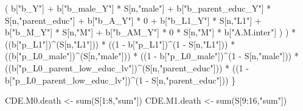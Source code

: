 \documentclass[
]{book}
\newenvironment{Shaded}{\begin{snugshade}}{\end{snugshade}}
\newcommand{\DecValTok}[1]{\textcolor[rgb]{0.00,0.00,0.81}{#1}}
\newcommand{\FunctionTok}[1]{\textcolor[rgb]{0.00,0.00,0.00}{#1}}
\newcommand{\NormalTok}[1]{#1}
\newcommand{\OtherTok}[1]{\textcolor[rgb]{0.56,0.35,0.01}{#1}}
\newcommand{\SpecialCharTok}[1]{\textcolor[rgb]{0.00,0.00,0.00}{#1}}
\newcommand{\StringTok}[1]{\textcolor[rgb]{0.31,0.60,0.02}{#1}}
\begin{document}
\begin{Shaded}
\begin{Highlighting}[]
\NormalTok{                      ( b[}\StringTok{"b\_Y"}\NormalTok{] }\SpecialCharTok{+} 
\NormalTok{                          b[}\StringTok{"b\_male\_Y"}\NormalTok{] }\SpecialCharTok{*}\NormalTok{ S[n,}\StringTok{"male"}\NormalTok{] }\SpecialCharTok{+} 
\NormalTok{                          b[}\StringTok{"b\_parent\_educ\_Y"}\NormalTok{] }\SpecialCharTok{*}\NormalTok{ S[n,}\StringTok{"parent\_educ"}\NormalTok{] }\SpecialCharTok{+} 
\NormalTok{                          b[}\StringTok{"b\_A\_Y"}\NormalTok{] }\SpecialCharTok{*} \DecValTok{0} \SpecialCharTok{+} 
\NormalTok{                          b[}\StringTok{"b\_L1\_Y"}\NormalTok{] }\SpecialCharTok{*}\NormalTok{ S[n,}\StringTok{"L1"}\NormalTok{] }\SpecialCharTok{+}
\NormalTok{                          b[}\StringTok{"b\_M\_Y"}\NormalTok{] }\SpecialCharTok{*}\NormalTok{ S[n,}\StringTok{"M"}\NormalTok{] }\SpecialCharTok{+}
\NormalTok{                          b[}\StringTok{"b\_AM\_Y"}\NormalTok{] }\SpecialCharTok{*} \DecValTok{0} \SpecialCharTok{*}\NormalTok{ S[n,}\StringTok{"M"}\NormalTok{] }\SpecialCharTok{*}\NormalTok{ b[}\StringTok{"A.M.inter"}\NormalTok{] ) ) }\SpecialCharTok{*}
\NormalTok{      ((b[}\StringTok{"p\_L1"}\NormalTok{])}\SpecialCharTok{\^{}}\NormalTok{(S[n,}\StringTok{"L1"}\NormalTok{])) }\SpecialCharTok{*}
\NormalTok{      ((}\DecValTok{1} \SpecialCharTok{{-}}\NormalTok{ b[}\StringTok{"p\_L1"}\NormalTok{])}\SpecialCharTok{\^{}}\NormalTok{(}\DecValTok{1} \SpecialCharTok{{-}}\NormalTok{ S[n,}\StringTok{"L1"}\NormalTok{])) }\SpecialCharTok{*}
\NormalTok{      ((b[}\StringTok{"p\_L0\_male"}\NormalTok{])}\SpecialCharTok{\^{}}\NormalTok{(S[n,}\StringTok{"male"}\NormalTok{])) }\SpecialCharTok{*} 
\NormalTok{      ((}\DecValTok{1} \SpecialCharTok{{-}}\NormalTok{ b[}\StringTok{"p\_L0\_male"}\NormalTok{])}\SpecialCharTok{\^{}}\NormalTok{(}\DecValTok{1} \SpecialCharTok{{-}}\NormalTok{ S[n,}\StringTok{"male"}\NormalTok{])) }\SpecialCharTok{*} 
\NormalTok{      ((b[}\StringTok{"p\_L0\_parent\_low\_educ\_lv"}\NormalTok{])}\SpecialCharTok{\^{}}\NormalTok{(S[n,}\StringTok{"parent\_educ"}\NormalTok{])) }\SpecialCharTok{*}
\NormalTok{      ((}\DecValTok{1} \SpecialCharTok{{-}}\NormalTok{ b[}\StringTok{"p\_L0\_parent\_low\_educ\_lv"}\NormalTok{])}\SpecialCharTok{\^{}}\NormalTok{(}\DecValTok{1} \SpecialCharTok{{-}}\NormalTok{ S[n,}\StringTok{"parent\_educ"}\NormalTok{])) }
\NormalTok{    \}}
  
\NormalTok{  CDE.M0.death }\OtherTok{\textless{}{-}} \FunctionTok{sum}\NormalTok{(S[}\DecValTok{1}\SpecialCharTok{:}\DecValTok{8}\NormalTok{,}\StringTok{"sum"}\NormalTok{])}
\NormalTok{  CDE.M1.death }\OtherTok{\textless{}{-}} \FunctionTok{sum}\NormalTok{(S[}\DecValTok{9}\SpecialCharTok{:}\DecValTok{16}\NormalTok{,}\StringTok{"sum"}\NormalTok{])}
  

\end{Highlighting}
\end{Shaded}
\end{document}
